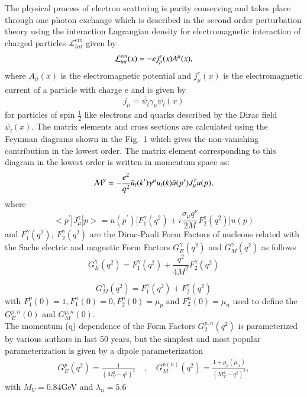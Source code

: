      The physical process of electron scattering is parity conserving and takes place through one photon exchange which is described in the second order perturbation theory using the interaction Lagrangian density for electromagnetic interaction  of charged particles $\mathcal{L}_{int}^{em}$  given by 
     \begin{equation}
     {\cal L}_{int}^{em}(x) = -e j_{\mu}^{e}(x)A^{\mu}(x),\label{chap9-eq1}
     \end{equation}
     where $A_\mu(x)$ is the electromagnetic potential and $j_\mu^e(x)$ is the electromagnetic current of a particle with charge e and is given by 
     \begin{equation}
     j_\mu =\bar{\psi_l}\gamma_\mu \psi_l(x) \label{chap9-eq2}
     \end{equation}
     for particles of spin $\frac{1}{2}$ like electrons and quarks described by the Dirac field $\psi_{l}(x)$. The matrix elements and cross sections are calculated using the Feynman diagrams shown in the Fig.~1 which gives the non-vanishing contribution in the lowest order. The matrix element corresponding to this diagram in the lowest order is written in momentum
space as:
     \begin{equation}
     {\cal M}^{\gamma} = -\frac{e^2}{q^2}\bar{u}_l(k')\gamma^\mu u_l(k) \bar{u}(p^\prime)J_\mu^\gamma u(p), \label{chap9-eq3}
    \end{equation}
  where 
  \begin{equation}
   <p^\prime|J_\mu^\gamma|p>= \bar{u}(p^\prime)\big[F_1^{\gamma}(q^2)+i\frac{\sigma_\mu q^\nu}{2M}F_2^{\gamma}(q^2)\big]u(p) \label{chap9-eq4} 
   \end{equation}
  and $F_1^\gamma(q^2),~ F_2^\gamma(q^2) $ are the Dirac-Pauli Form Factors of nucleons related with the Sachs electric and magnetic Form Factors $G_E^\gamma(q^2)$ and $G_M^\gamma(q^2)$  as follows
  \begin{equation}
  G_E^\gamma(q^2) = F_1^\gamma(q^2)+\frac{q^2}{4M^2}F^\gamma_2(q^2) \label{chap9-eq5}
  \end{equation}
  
   \begin{equation}
   G_M^\gamma(q^2) = F_1^\gamma(q^2)+F_2^\gamma(q^2) \label{chap9-eq6}
  \end{equation}
  with $F_1^p(0)=1, F_1^n(0)=0, F_2^p(0)=\mu_p$ and $F_2^n(0)=\mu_n$ used to define the $G_E^{p,n}(0)$ and $G_M^{p,n}(0)$. \\
  The momentum (q) dependence of the Form Factors $G_2^{p,n}(q^2)$ is parameterized by various authors in last 50 years, but the simplest and most popular parameterization is given by a dipole parameterization 
  \begin{align}
      G_E^p(q^2)=\frac{1}{(M_{V}^2 - q^2 )^2}  \quad ,  \quad 
      G_M^{p(n)}(q^2)=\frac{1+\mu_p(\mu_n)}{(M_{V}^2 - q^2)^2} , \label{chap9-eq7}
  \end{align} 
\noindent
   with $M_V= 0.84$GeV and $\lambda_n=5.6$
   
